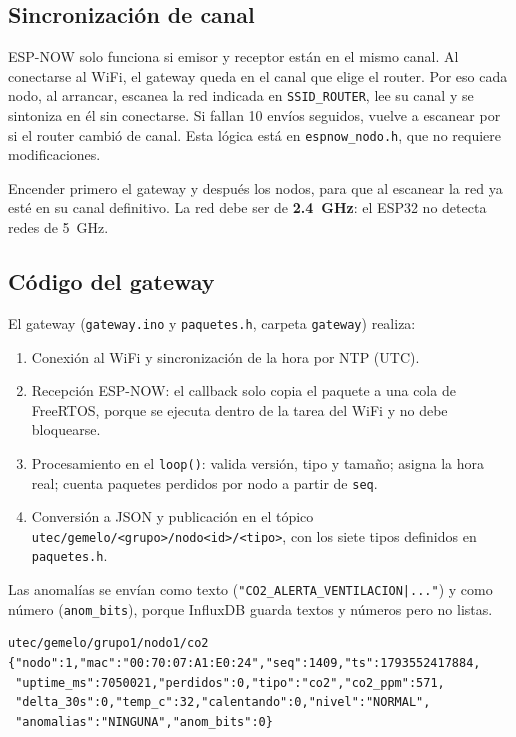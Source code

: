 \documentclass[11pt,a4paper]{article}
\newcommand{\arch}[1]{\texttt{#1}}
\begin{document}
\subsection{Sincronizaci\'on de canal}

ESP-NOW solo funciona si emisor y receptor est\'an en el mismo canal. Al conectarse al WiFi,
el gateway queda en el canal que elige el router. Por eso cada nodo, al arrancar, escanea la
red indicada en \texttt{SSID\_ROUTER}, lee su canal y se sintoniza en \'el sin conectarse.
Si fallan 10 env\'ios seguidos, vuelve a escanear por si el router cambi\'o de canal. Esta
l\'ogica est\'a en \arch{espnow\_nodo.h}, que no requiere modificaciones.

\begin{nota}
Encender primero el gateway y despu\'es los nodos, para que al escanear la red ya est\'e en su
canal definitivo. La red debe ser de \textbf{2.4~GHz}: el ESP32 no detecta redes de 5~GHz.
\end{nota}

\subsection{C\'odigo del gateway}

El gateway (\arch{gateway.ino} y \arch{paquetes.h}, carpeta \arch{gateway}) realiza:
\begin{enumerate}
  \item Conexi\'on al WiFi y sincronizaci\'on de la hora por NTP (UTC).
  \item Recepci\'on ESP-NOW: el callback solo copia el paquete a una cola de FreeRTOS, porque
        se ejecuta dentro de la tarea del WiFi y no debe bloquearse.
  \item Procesamiento en el \texttt{loop()}: valida versi\'on, tipo y tama\~no; asigna la hora
        real; cuenta paquetes perdidos por nodo a partir de \texttt{seq}.
  \item Conversi\'on a JSON y publicaci\'on en el t\'opico
        \texttt{utec/gemelo/<grupo>/nodo<id>/<tipo>}, con los siete tipos definidos
        en \arch{paquetes.h}.
\end{enumerate}

Las anomal\'ias se env\'ian como texto (\texttt{"CO2\_ALERTA\_VENTILACION|..."}) y como
n\'umero (\texttt{anom\_bits}), porque InfluxDB guarda textos y n\'umeros pero no listas.

\begin{lstlisting}[style=plano, caption={Ejemplo de mensaje publicado por el gateway.}]
utec/gemelo/grupo1/nodo1/co2
{"nodo":1,"mac":"00:70:07:A1:E0:24","seq":1409,"ts":1793552417884,
 "uptime_ms":7050021,"perdidos":0,"tipo":"co2","co2_ppm":571,
 "delta_30s":0,"temp_c":32,"calentando":0,"nivel":"NORMAL",
 "anomalias":"NINGUNA","anom_bits":0}
\end{lstlisting}
\end{document}
